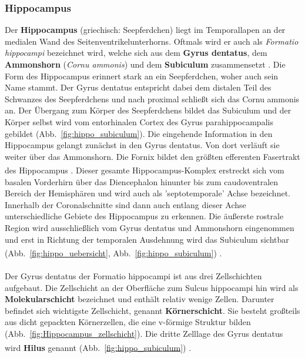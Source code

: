 \documentclass[12pt,a4paper,pdftex]{article}
\begin{document}
\subsubsection*{Hippocampus} 
Der \textbf{Hippocampus} (griechisch: Seepferdchen) liegt im Temporallapen an der medialen Wand des Seitenventrikelunterhorns. Oftmals wird er auch als \textit{Formatio hippocampi}  bezeichnet wird, welche sich aus dem \textbf{Gyrus dentatus}, dem \textbf{Ammonshorn} (\textit{Cornu ammonis}) und dem \textbf{Subiculum} zusammensetzt . Die Form des Hippocampus erinnert stark an ein Seepferdchen, woher auch sein Name stammt. Der Gyrus dentatus entspricht dabei dem distalen Teil des Schwanzes des Seepferdchens und nach proximal schließt sich das Cornu ammonis an. Der Übergang zum Körper des Seepferdchens bildet das Subiculum und der Körper selbst wird vom entorhinalen Cortex des Gyrus parahippocampalis gebildet (Abb.~\ref{fig:hippo_subiculum}). Die eingehende Information in den Hippocampus gelangt zunächst in den Gyrus dentatus. Von dort verläuft sie weiter über das Ammonshorn. Die Fornix bildet den größten efferenten Fasertrakt des Hippocampus \textsuperscript{\cite[9]{trepel2011neuroanatomie}}. Dieser gesamte Hippocampus-Komplex erstreckt sich vom basalen Vorderhirn über das Diencephalon hinunter bis zum caudoventralen Bereich der Hemisphären und wird auch als 'septotemporale' Achse bezeichnet. Innerhalb der Coronalschnitte sind dann auch entlang dieser Achse unterschiedliche Gebiete des Hippocampus zu erkennen. Die äußerste rostrale Region wird ausschließlich vom Gyrus dentatus und Ammonshorn eingenommen und erst in Richtung der temporalen Ausdehnung wird das Subiculum sichtbar (Abb.~\ref{fig:hippo_uebersicht}, Abb.~\ref{fig:hippo_subiculum}) \textsuperscript{\cite[20]{paxinos2014rat}}.\\
\\ \noindent Der Gyrus dentatus der Formatio hippocampi ist aus drei Zellschichten aufgebaut. Die Zellschicht an der Oberfläche zum Sulcus hippocampi hin wird als \textbf{Molekularschicht} bezeichnet und enthält relativ wenige Zellen. Darunter befindet sich wichtigste Zellschicht, genannt \textbf{Körnerschicht}. Sie besteht großteils aus dicht gepackten Körnerzellen, die eine v-förmige Struktur bilden (Abb.~\ref{fig:Hippocampus_zellschicht}). Die dritte Zelllage des Gyrus dentatus wird \textbf{Hilus} genannt (Abb.~\ref{fig:hippo_subiculum}) \textsuperscript{\cite[20]{paxinos2014rat}}.\\
\end{document}
